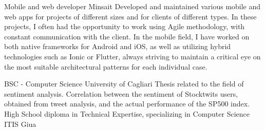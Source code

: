 \documentclass[
	a4paper,
]{fortysecondscv}
\begin{document}
\makefrontsidebar

\begin{cvtable}[2.3]
        {Mobile and web developer}
        {Minsait}
        {Developed and maintained various mobile and web apps for projects of different sizes and for clients of different types. In these projects, I often had the opportunity to work using Agile methodology, with constant communication with the client. In the mobile field, I have worked on both native frameworks for Android and iOS, as well as utilizing hybrid technologies such as Ionic or Flutter, always striving to maintain a critical eye on the most suitable architectural patterns for each individual case.}
\end{cvtable}


\begin{cvtable}[3]
        {BSC - Computer Science}
        {University of Cagliari}
        {Thesis related to the field of sentiment analysis. Correlation between the sentiment of Stocktwits users, obtained from tweet analysis, and the actual performance of the SP500 index.}
        {High School diploma in Technical Expertise, specializing in Computer Science}
        {ITIS Giua}
        {\\}
\end{cvtable}
\end{document}
